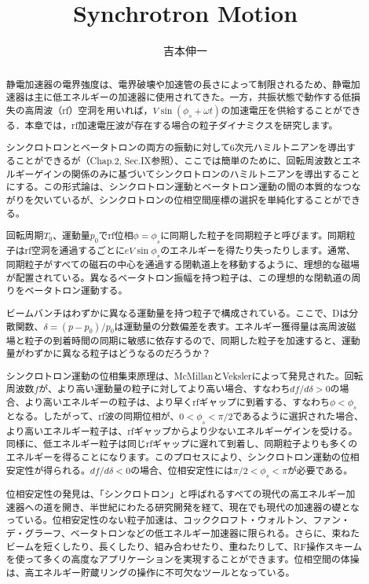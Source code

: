 \documentclass[]{jlreq}
\begin{document}
\title{Synchrotron Motion}
\author{吉本伸一}
\maketitle
\tableofcontents
\clearpage

\begin{abstract}
  静電加速器の電界強度は、電界破壊や加速管の長さによって制限されるため、静電加速器は主に低エネルギーの加速器に使用されてきた。一方，共振状態で動作する低損失の高周波（rf）空洞を用いれば，$V \sin(\phi_s + \omega t)$の加速電圧を供給することができる．本章では，rf加速電圧波が存在する場合の粒子ダイナミクスを研究します。
  
  シンクロトロンとベータトロンの両方の振動に対して6次元ハミルトニアンを導出することができるが（Chap.2, Sec.IX参照）、ここでは簡単のために、回転周波数とエネルギーゲインの関係のみに基づいてシンクロトロンのハミルトニアンを導出することにする。この形式論は、シンクロトロン運動とベータトロン運動の間の本質的なつながりを欠いているが、シンクロトロンの位相空間座標の選択を単純化することができる。
  
  回転周期$T_0$、運動量$p_0$でrf位相$\phi = \phi_s$に同期した粒子を同期粒子と呼びます。同期粒子はrf空洞を通過するごとに$e V \sin \phi_s$のエネルギーを得たり失ったりします。通常、同期粒子がすべての磁石の中心を通過する閉軌道上を移動するように、理想的な磁場が配置されている。異なるベータトロン振幅を持つ粒子は、この理想的な閉軌道の周りをベータトロン運動する。
  
  ビームバンチはわずかに異なる運動量を持つ粒子で構成されている。ここで、Dは分散関数、$\delta = (p - p_0)/p_0$は運動量の分数偏差を表す。エネルギー獲得量は高周波磁場と粒子の到着時間の同期に敏感に依存するので、同期した粒子を加速すると、運動量がわずかに異なる粒子はどうなるのだろうか？
  
  シンクロトロン運動の位相集束原理は、McMillanとVekslerによって発見された\cite{McMillan}。回転周波数$f$が、より高い運動量の粒子に対してより高い場合、すなわち$df / d\delta > 0$の場合、より高いエネルギーの粒子は、より早くrfギャップに到着する、すなわち$\phi < \phi_s$となる。したがって、rf波の同期位相が、$0 < \phi_s< \pi/2$であるように選択された場合、より高いエネルギー粒子は、rfギャップからより少ないエネルギーゲインを受ける。同様に、低エネルギー粒子は同じrfギャップに遅れて到着し、同期粒子よりも多くのエネルギーを得ることになります。このプロセスにより、シンクロトロン運動の位相安定性が得られる。$df/d\delta < 0$の場合、位相安定性には$\pi/2 < \phi_s < \pi$が必要である。
  
  位相安定性の発見は、「シンクロトロン」と呼ばれるすべての現代の高エネルギー加速器への道を開き、半世紀にわたる研究開発を経て、現在でも現代の加速器の礎となっている。位相安定性のない粒子加速は、コッククロフト・ウォルトン、ファン・デ・グラーフ、ベータトロンなどの低エネルギー加速器に限られる。さらに、束ねたビームを短くしたり、長くしたり、組み合わせたり、重ねたりして、RF操作スキームを使って多くの高度なアプリケーションを実現することができます。位相空間の体操は、高エネルギー貯蔵リングの操作に不可欠なツールとなっている。
  

\end{abstract}
\end{document}
